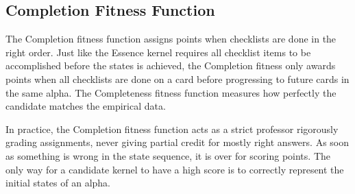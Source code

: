 \documentclass[preprint,12pt,3p]{elsarticle}
\begin{document}


\subsection{Completion Fitness Function}
The Completion fitness function assigns points when checklists are done in the right order. Just like the Essence kernel requires all checklist items to be accomplished before the states is achieved, the Completion fitness only awards points when all checklists are done on a card before progressing to future cards in the same alpha. The Completeness fitness function measures how perfectly the candidate matches the empirical data. 


In practice, the Completion fitness function acts as a strict professor rigorously grading assignments, never giving partial credit for mostly right answers. As soon as something is wrong in the state sequence, it is over for scoring points. The only way for a candidate kernel to have a high score is to correctly represent the initial states of an alpha.
\end{document}
